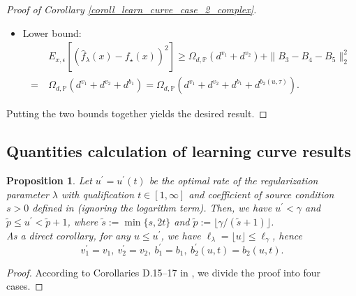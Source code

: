 \documentclass{article}
\theoremstyle{plain}
\newtheorem{proposition}[theorem]{Proposition}
\theoremstyle{definition}
\theoremstyle{remark}
\begin{document}
\begin{appendix}
\begin{proof}[Proof of Corollary \ref{coroll_learn_curve_case_2_complex}]
\begin{itemize}
\item Lower bound:
\begin{align*}
&~ E_{x, \epsilon} \left[ \left(\hat{f}_{\lambda}(x) - f_{\star}(x) \right)^{2} \right]
\geq  \Omega_{d, \mathbb{P}} \left( d^{v_1} + d^{v_2} \right) + \|B_3-B_4-B_5\|_{2}^{2}\\
=&~
\Omega_{d, \mathbb{P}} \left( d^{v_1} + d^{v_2} + d^{b_1}\right)
=
\Omega_{d, \mathbb{P}} \left( d^{v_1} + d^{v_2} + d^{b_1} + d^{b_2(u, \tau)}\right).
\end{align*}

\end{itemize}
Putting the two bounds together yields the desired result. 
\end{proof}


% 







\subsection{Quantities calculation of learning curve results}




\begin{proposition}\label{prop_e_1}
    Let $u^{\prime} = u^{\prime}(t)$ be the optimal rate of the regularization parameter $\lambda$ with qualification $t \in [1, \infty]$ and coefficient of source condition $s>0$ defined in \cite{lu2024saturation} (ignoring the logarithm term). Then, we have $u^{\prime} < \gamma$ and $\tilde{p} \leq u^{\prime} < \tilde{p}+1$, where $\tilde{s} := \min\{s, 2t\}$ and $\tilde{p}:=\lfloor \gamma/(\tilde{s}+1)\rfloor$.\\
    As a direct corollary, for any $u \leq u^{\prime}$, we have $\ell_{\lambda} = \lfloor u \rfloor \leq \ell_{\gamma}$, hence
$$
v_1^{\prime} = v_1, ~ v_2^{\prime} = v_2, ~
b_1^{\prime} = b_1, ~ b_2^{\prime}(u, t) = b_2(u, t).
$$
\end{proposition}
\begin{proof}
According to Corollaries D.15--17 in \cite{lu2024saturation}, we divide the proof into four cases.


\end{proof}
\end{appendix}
\end{document}
